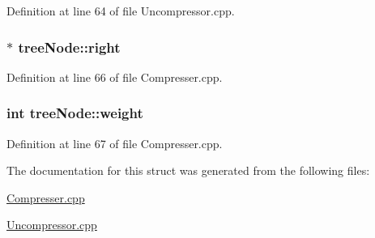 \-Definition at line 64 of file \-Uncompressor.\-cpp.

\hypertarget{structtree_node_a1739e714a0a9e0d21ef728d4b67e01d3}{
\subsubsection[{right}]{ $\ast$ {\bf tree\-Node\-::right}}}\label{structtree_node_a1739e714a0a9e0d21ef728d4b67e01d3}


\-Definition at line 66 of file \-Compresser.\-cpp.

\hypertarget{structtree_node_a2c160a93c53987e6342f961ebce33fa4}{
\subsubsection[{weight}]{\setlength{\rightskip}{0pt plus 5cm}int {\bf tree\-Node\-::weight}}}\label{structtree_node_a2c160a93c53987e6342f961ebce33fa4}


\-Definition at line 67 of file \-Compresser.\-cpp.



\-The documentation for this struct was generated from the following files\-:\begin{DoxyCompactItemize}
\item 
\hyperlink{_compresser_8cpp}{\-Compresser.\-cpp}\item 
\hyperlink{_uncompressor_8cpp}{\-Uncompressor.\-cpp}\end{DoxyCompactItemize}
